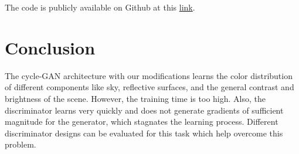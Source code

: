 \documentclass[10pt,twocolumn,letterpaper]{article}
\begin{document}
The code is publicly available on Github at this \href{https://github.com/ayushbaid/cloudy-cycle-gans}{link}.

\section{Conclusion}
The cycle-GAN architecture with our modifications learns the color distribution of different components like sky, reflective surfaces, and the general contrast and brightness of the scene. However, the training time is too high. Also, the discriminator learns very quickly and does not generate gradients of sufficient magnitude for the generator, which stagnates the learning process. Different discriminator designs can be evaluated for this task which help overcome this problem.

{\small


}
\end{document}
